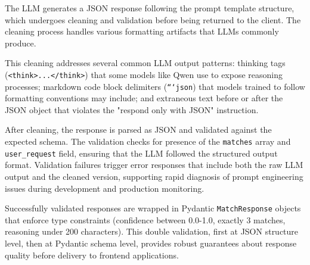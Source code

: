 The LLM generates a JSON response following the prompt template structure, which undergoes cleaning and validation before being returned to the client. The cleaning process handles various formatting artifacts that LLMs commonly produce.

%     
%     
%     
%     

This cleaning addresses several common LLM output patterns: thinking tags (\texttt{<think>...</think>}) that some models like Qwen use to expose reasoning processes; markdown code block delimiters (\texttt{```json}) that models trained to follow formatting conventions may include; and extraneous text before or after the JSON object that violates the "respond only with JSON" instruction.

After cleaning, the response is parsed as JSON and validated against the expected schema. The validation checks for presence of the \texttt{matches} array and \texttt{user\_request} field, ensuring that the LLM followed the structured output format. Validation failures trigger error responses that include both the raw LLM output and the cleaned version, supporting rapid diagnosis of prompt engineering issues during development and production monitoring.

Successfully validated responses are wrapped in Pydantic \texttt{MatchResponse} objects that enforce type constraints (confidence between 0.0-1.0, exactly 3 matches, reasoning under 200 characters). This double validation, first at JSON structure level, then at Pydantic schema level, provides robust guarantees about response quality before delivery to frontend applications.

